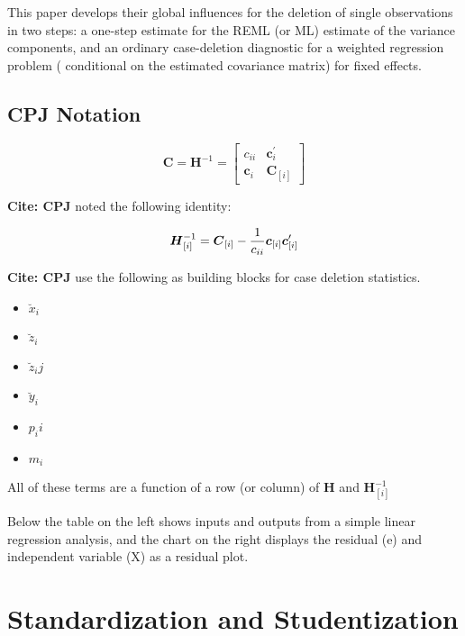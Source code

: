 This paper develops their global influences for the deletion of single observations in two steps: a one-step estimate for the REML (or ML) estimate of the variance components, and an ordinary case-deletion diagnostic for a weighted regression problem ( conditional on the estimated covariance matrix) for fixed effects.


\subsection{CPJ Notation} %

\[ \boldsymbol{C} = \boldsymbol{H}^{-1} = \left[
\begin{array}{cc}
c_{ii} & \boldsymbol{c}_{i}^{\prime}\\
\boldsymbol{c}_{i} &  \boldsymbol{C}_{[i]}
\end{array} \right]
\]

\textbf{Cite: CPJ}  noted the following identity:

\[ \boldsymbol{H}_{[i]}^{-1}  = \boldsymbol{C}_{[i]} - {1 \over c_{ii}}\boldsymbol{c}_{[i]}\boldsymbol{c}_{[i]}^{\prime} \]


\textbf{Cite: CPJ} use the following as building blocks for case deletion statistics.
\begin{itemize}
\item $\breve{x}_i$
\item $\breve{z}_i$
\item $\breve{z}_ij$
\item $\breve{y}_i$
\item $p_ii$
\item $m_i$
\end{itemize}
All of these terms are a function of a row (or column) of $\boldsymbol{H}$ and $\boldsymbol{H}_{[i]}^{-1}$


\newpage

Below the table on the left shows inputs and outputs from a simple linear regression analysis, and the chart on the right displays the residual (e) and independent variable (X) as a residual plot.

\newpage


\newpage
\section{Standardization and Studentization}


